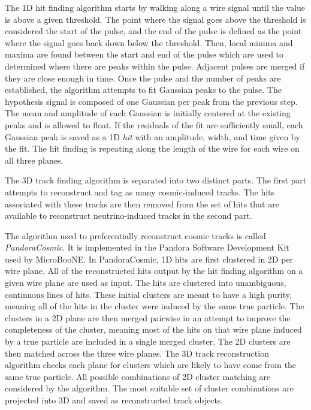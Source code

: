     The 1D hit finding algorithm starts by walking along a wire signal until
    the value is above a given threshold. The point where the signal goes above
    the threshold is considered the start of the pulse, and the end of the
    pulse is defined as the point where the signal goes back down below the
    threshold.  Then, local minima and maxima are found between the start and
    end of the pulse which are used to determined where there are peaks within
    the pulse.  Adjacent pulses are merged if they are close enough in time.
    Once the pulse and the number of peaks are established, the algorithm
    attempts to fit Gaussian peaks to the pulse. The hypothesis signal is
    composed of one Gaussian per peak from the previous step. The mean and
    amplitude of each Gaussian is initially centered at the existing peaks and
    is allowed to float. If the residuals of the fit are sufficiently small,
    each Gaussian peak is saved as a 1D \textit{hit} with an amplitude, width,
    and time given by the fit. The hit finding is repeating along the length of
    the wire for each wire on all three planes.

    The 3D track finding algorithm is separated into two distinct parts. The
    first part attempts to reconstruct and tag as many cosmic-induced tracks.
    The hits associated with these tracks are then removed from the set of hits
    that are available to reconstruct neutrino-induced tracks in the second
    part. 

    The algorithm used to preferentially reconstruct cosmic tracks is called
    \textit{PandoraCosmic}. It is implemented in the Pandora Software
    Development Kit~\cite{Acciarri:2017hat} used by MicroBooNE. In
    PandoraCosmic, 1D hits are first clustered in 2D per wire plane.  All of
    the reconstructed hits output by the hit finding algorithm on a given wire
    plane are used as input. The hits are clustered into unambiguous,
    continuous lines of hits. These initial clusters are meant to have a high
    purity, meaning all of the hits in the cluster were induced by the same
    true particle. The clusters in a 2D plane are then merged pairwise in an
    attempt to improve the completeness of the cluster, meaning most of the
    hits on that wire plane induced by a true particle are included in a single
    merged cluster. The 2D clusters are then matched across the three wire
    planes. The 3D track reconstruction algorithm checks each plane for
    clusters which are likely to have come from the same true particle.  All
    possible combinations of 2D cluster matching are considered by the
    algorithm. The most suitable set of cluster combinations are projected into
    3D and saved as reconstructed track objects.

